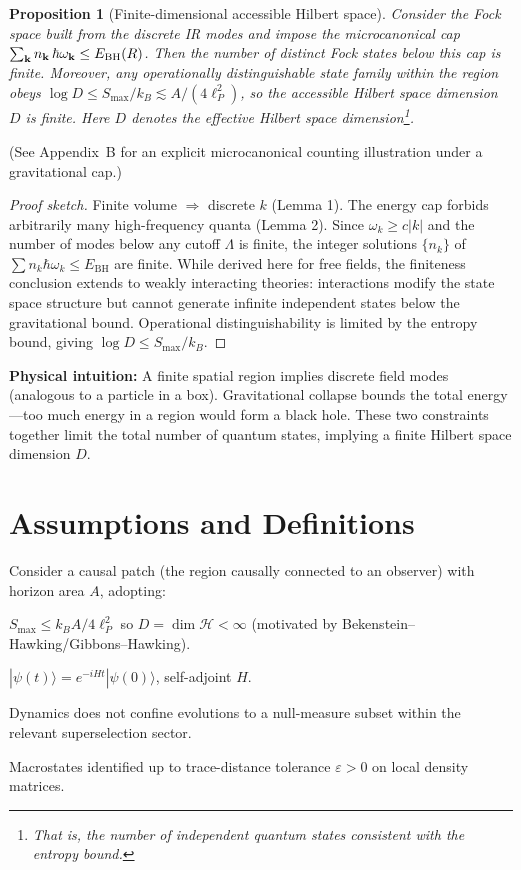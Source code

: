 \documentclass[12pt]{article}
\newcommand{\Smax}{S_{\max}}
\newtheorem{proposition}{Proposition}
\theoremstyle{remark}
\begin{document}
\begin{proposition}[Finite-dimensional accessible Hilbert space]\label{prop:finiteD}
Consider the Fock space built from the discrete IR modes and impose the microcanonical cap 
$\sum_{\mathbf{k}} n_{\mathbf{k}}\,\hbar\omega_{\mathbf{k}}\le E_{\rm BH}(R)$. 
Then the number of distinct Fock states below this cap is finite. 
Moreover, any operationally distinguishable state family within the region obeys 
$\log D \le \Smax/k_B \lesssim A/(4\ell_P^2)$, so the accessible Hilbert space dimension $D$ is finite. Here $D$ denotes the effective Hilbert space dimension\footnote{That is, the number of independent quantum states consistent with the entropy bound.}.

\end{proposition}
\noindent(See Appendix~B for an explicit microcanonical counting illustration under a gravitational cap.)

\begin{proof}[Proof sketch]
Finite volume $\Rightarrow$ discrete $k$ (Lemma 1). The energy cap forbids arbitrarily 
many high-frequency quanta (Lemma 2). Since $\omega_k \geq c|k|$ and the number of modes 
below any cutoff $\Lambda$ is finite, the integer solutions $\{n_k\}$ of 
$\sum n_k \hbar \omega_k \leq E_{\mathrm{BH}}$ are finite. While derived here for free 
fields, the finiteness conclusion extends to weakly interacting theories: interactions 
modify the state space structure but cannot generate infinite independent states below 
the gravitational bound. Operational distinguishability is limited by the entropy bound, 
giving $\log D \leq S_{\max}/k_B$.
\end{proof}

\textbf{Physical intuition:} A finite spatial region implies discrete field modes (analogous to a particle in a box). 
Gravitational collapse bounds the total energy---too much energy in a region would form a black hole. 
These two constraints together limit the total number of quantum states, implying a finite Hilbert space dimension $D$.


\section{Assumptions and Definitions}
Consider a causal patch (the region causally connected to an observer) with horizon area $A$, adopting:
\begin{description}[leftmargin=1.5em,labelsep=0.5em]
  \item[(A1) Finite information bound:] $\Smax \leq k_B A/4\ell^2_P$ so $D = \dim \mathcal{H} < \infty$ (motivated by Bekenstein–Hawking/Gibbons–Hawking).
  \item[(A2) Unitary dynamics:] $|\psi(t)\rangle=e^{-iHt}|\psi(0)\rangle$, self-adjoint $H$.
  \item[(A3) Sector mixing (optional):] Dynamics does not confine evolutions to a null-measure subset within the relevant superselection sector.
  \item[(A4) Finite-resolution observers:] Macrostates identified up to trace-distance tolerance $\varepsilon>0$ on local density matrices.
\end{description}
\end{document}
